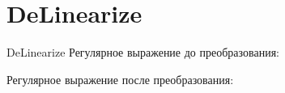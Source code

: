 \section{DeLinearize}
\begin{frame}{DeLinearize}
	Регулярное выражение до преобразования:

	Регулярное выражение после преобразования:

\end{frame}
